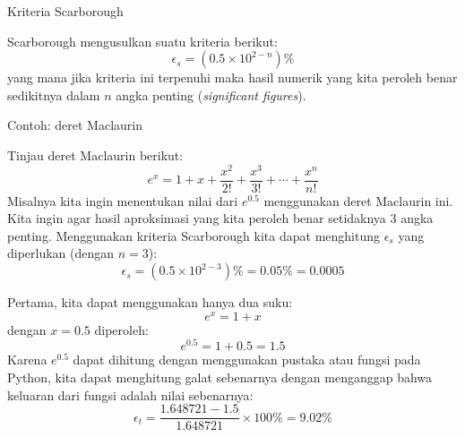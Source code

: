 \begin{frame}{Kriteria Scarborough}

Scarborough mengusulkan suatu kriteria berikut:
\begin{equation*}
\epsilon_{s} = (0.5 \times 10^{2-n})\%
\end{equation*}
yang mana jika kriteria ini terpenuhi maka hasil numerik yang kita peroleh
benar sedikitnya dalam $n$ angka penting (\textit{significant figures}).

\end{frame}



\begin{frame}[fragile]{Contoh: deret Maclaurin}
\fontsize{9}{10}\selectfont

Tinjau deret Maclaurin berikut:
\begin{equation*}
e^{x} = 1 + x + \frac{x^2}{2!} + \frac{x^3}{3!} + \cdots + \frac{x^{n}}{n!}
\end{equation*}
Misalnya kita ingin menentukan nilai dari $e^{0.5}$ menggunakan deret Maclaurin ini.
Kita ingin agar hasil aproksimasi yang kita peroleh benar setidaknya 3 angka penting.
Menggunakan kriteria Scarborough kita dapat menghitung $\epsilon_s$ yang
diperlukan (dengan $n=3$):
\begin{equation*}
\epsilon_{s} = (0.5 \times 10^{2-3})\% = 0.05\% = 0.0005
\end{equation*}

Pertama, kita dapat menggunakan hanya dua suku:
$$
e^{x} = 1 + x
$$
dengan $x = 0.5$ diperoleh:
$$
e^{0.5} = 1 + 0.5 = 1.5
$$
Karena $e^{0.5}$ dapat dihitung dengan menggunakan pustaka atau fungsi 
pada Python, kita dapat menghitung galat sebenarnya dengan menganggap bahwa keluaran
dari fungsi  adalah nilai sebenarnya:
$$
\epsilon_{t} = \frac{1.648721 - 1.5}{1.648721} \times 100\% = 9.02\%
$$
\end{frame}


